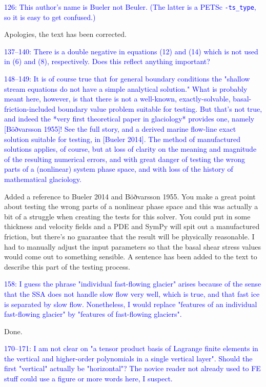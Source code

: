 \documentclass{article}
\theoremstyle{definition}
\theoremstyle{plain}
\begin{document}
\textcolor{blue}{126:  This author's name is Bueler not Beuler.  (The latter is a PETSc \texttt{-ts\_type}, so it is easy to get confused.)}

Apologies, the text has been corrected.

\textcolor{blue}{137--140:  There is a double negative in equations (12) and (14) which is not used in (6) and (8), respectively.  Does this reflect anything important?}

\textcolor{blue}{148--149:  It is of course true that for general boundary conditions the "shallow stream equations do not have a simple analytical solution."  What is probably meant here, however, is that there is not a well-known, exactly-solvable, basal-friction-included boundary value problem suitable for testing.  But that's not true, and indeed the *very first theoretical paper in glaciology* provides one, namely [Böðvarsson 1955]!  See the full story, and a derived marine flow-line exact solution suitable for testing, in [Bueler 2014].  The method of manufactured solutions applies, of course, but at loss of clarity on the meaning and magnitude of the resulting numerical errors, and with great danger of testing the wrong parts of a (nonlinear) system phase space, and with loss of the history of mathematical glaciology.}

Added a reference to Bueler 2014 and Böðvarsson 1955.
You make a great point about testing the wrong parts of a nonlinear phase space and this was actually a bit of a struggle when creating the tests for this solver.
You could put in some thickness and velocity fields and a PDE and SymPy will spit out a manufactured friction, but there's no guarantee that the result will be physically reasonable.
I had to manually adjust the input parameters so that the basal shear stress values would come out to something sensible.
A sentence has been added to the text to describe this part of the testing process.

\textcolor{blue}{158:  I guess the phrase "individual fast-flowing glacier" arises because of the sense that the SSA does not handle slow flow very well, which is true, and that fast ice is separated by slow flow.  Nonetheless, I would replace "features of an individual fast-flowing glacier" by "features of fast-flowing glaciers".}

Done.

\textcolor{blue}{170--171:  I am not clear on "a tensor product basis of Lagrange finite elements in the vertical and higher-order polynomials in a single vertical layer".  Should the first "vertical" actually be "horizontal"?  The novice reader not already used to FE stuff could use a figure or more words here, I suspect.}
\end{document}
